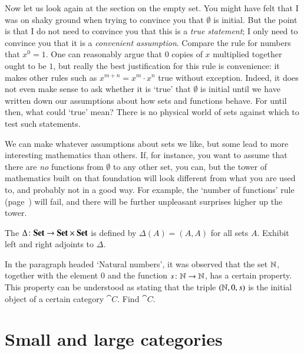 Now let us look again at the section on the empty%
%
%
set.  You might have felt that I was on shaky ground when trying to
convince you that $\emptyset$ is initial.  But the point is that I do not
need to convince you that this is a \emph{true statement}; I only need to
convince you that it is a \emph{convenient assumption}.  Compare the rule
for numbers that $x^0 = 1$.  One can reasonably argue that $0$ copies of
$x$ multiplied together ought to be $1$, but really the best justification
for this rule is convenience: it makes other rules such as $x^{m + n} = x^m
\cdot x^n$ true without exception.  Indeed, it does not even make sense to
ask whether it is `true' that $\emptyset$ is initial until we have written
down our assumptions about how sets and functions behave.  For until then,
what could `true' mean?  There is no physical world of sets against which
to test such statements.

We can make whatever assumptions about sets we like, but some lead to more
interesting mathematics than others.  If, for instance, you want to assume
that there are \emph{no} functions from $\emptyset$ to any other set, you
can, but the tower of mathematics built on that foundation will look
different from what you are used to, and probably not in a good way.  For
example, the `number of functions' rule (page~\pageref{p:num-fns}) will
fail, and there will be further unpleasant surprises higher up the tower.%
%
%
%
%

\exs


\begin{question}
\label{ex:diagonal-Set}
The  $\Delta\from \Set \to \Set \times \Set$%
%
%
is defined by $\Delta(A) = (A, A)$ for all sets $A$.  Exhibit left and
right adjoints to $\Delta$.
\end{question}


\begin{question}
\label{ex:nno}
In the paragraph headed `Natural numbers', it was observed that the set
$\mathbb{N}$, together with the element $0$ and the function $s\from \nat \to
\nat$, has a certain property.  This property can be understood as stating
that the triple $(\mathbb{N}, 0, s)$ is the initial object of a certain category
$\cat{C}$.  Find $\cat{C}$.
\end{question}



\section{Small and large categories}
\label{sec:small-large}


